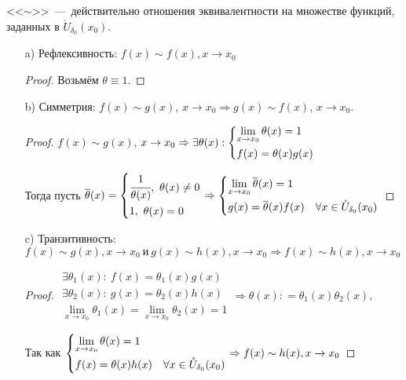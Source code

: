 \begin{note}
    <<$\sim$>>~---~действительно отношения эквивалентности на множестве функций, заданных в $\mathring U_{\delta_{0}}(x_{0}).$
    \begin{enumerate}
        \item[a)] Рефлексивность:  $f(x) \sim f(x), x\to x_{0}$ 
        
    \begin{proof}
        Возьмём $\theta \equiv 1$.
    \end{proof}
        \item[b)] Симметрия: $f(x) \sim g(x)$, $x\to x_{0} \Rightarrow g(x) \sim f(x)$, $x\to x_{0}.$
    \begin{proof}
        $f(x) \sim g(x)$, $x\to x_{0} \Rightarrow \exists \theta(x): \left\{ \begin{gathered}
        \lim\limits_{x \to x_{0}} \theta(x)= 1 \hfill \\
        f(x) = \theta(x) g(x) \hfill
        \end{gathered} \right.$ 

        Тогда пусть $\overline{\theta}(x) = \left\{ \begin{gathered}
            \cfrac{1}{\theta(x)}, \ \theta(x)\neq 0 \hfill \\
            1, \ \theta (x) =  0 \hfill
        \end{gathered} \right.
        \Rightarrow \left\{
        \begin{gathered}
        \lim\limits_{x\to x_{0}} \overline{\theta}(x) = 1 \hfill \\
        g(x) = \overline{\theta }(x) f(x) \quad \forall x\in \mathring{U}_{\delta_{0}}(x_{0}) 
        \end{gathered} \right.$
    \end{proof}
            \item[c)] Транзитивность: $f(x) \sim g(x), x\to x_{0} \ \textrm{и}\ g(x) \sim h(x),  x\to x_{0} \Rightarrow f(x) \sim h(x), x\to x_{0}$

    \begin{proof}
        $
        \begin{gathered}
            \exists \theta_{1}(x): \ f(x) = \theta_{1}(x) g(x) \\
            \exists \theta_{2}(x): \ g(x) = \theta_{2}(x) h(x) \\
            \lim\limits_{x \to x_{0}}\theta_{1}(x)= \lim\limits_{x \to x_{0}}\theta_{2}(x)= 1
        \end{gathered} 
        \Rightarrow \theta(x): = \theta_{1}(x)\theta_{2}(x),
        $
        
        Так как $
        \left\{ \begin{gathered}
        \lim\limits_{x \to x_{0}} \theta(x)= 1 \hfill \\
        f(x) = \theta(x) h(x) \quad \forall x\in \mathring{U}_{\delta_{0}}(x_{0})\hfill
        \end{gathered} \right.
        \Rightarrow
        f(x) \sim h(x), x\to x_{0}
        $      
    \end{proof}
    \end{enumerate}
\end{note}



